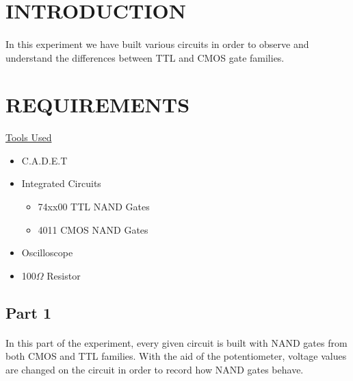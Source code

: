 \documentclass[pdftex,12pt,a4paper]{article}
\begin{document}
\setcounter{page}{1}

\section{INTRODUCTION}
\begin{flushleft}
\paragraph{}
In this experiment we have built various circuits in order to observe and understand the differences between TTL and CMOS gate families. 
\end{flushleft}

\section{REQUIREMENTS}
\begin{flushleft}
\underline{Tools Used}\cite{booklet}
\end{flushleft}
\begin{itemize}
    \item C.A.D.E.T
    \item Integrated Circuits
    \begin{itemize}
        \item 74xx00 TTL NAND Gates
        \item 4011 CMOS NAND Gates  
    \end{itemize}
    \item Oscilloscope
    \item 100$\Omega$ Resistor
\end{itemize}

\begin{flushleft}
\subsection{Part 1}
\paragraph{}
In this part of the experiment, every given circuit is built with NAND gates from both CMOS and TTL families. With the aid of the potentiometer, voltage values are changed on the circuit in order to record how NAND gates behave.  
\end{flushleft}
\end{document}
